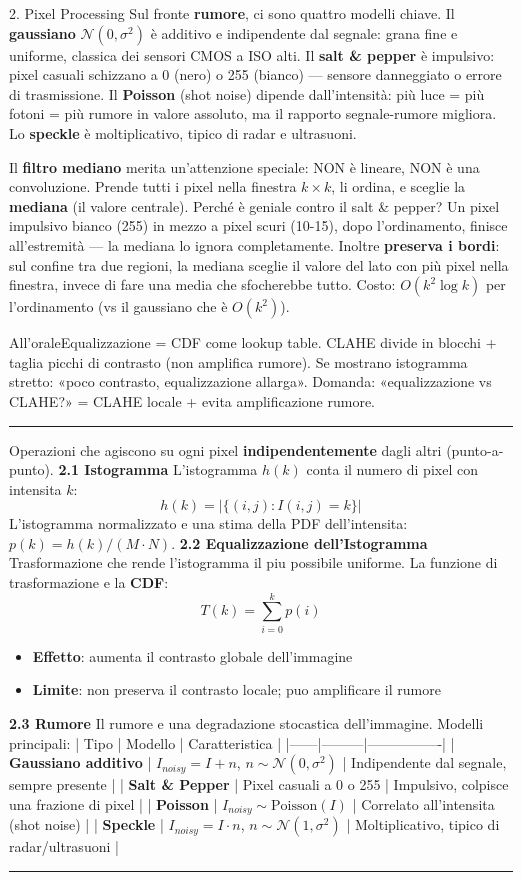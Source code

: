 \documentclass[italian,10pt]{beamer}
\newenvironment{orale}{%
  \setbeamercolor{block title}{fg=white,bg=co}%
  \setbeamercolor{block body}{fg=black,bg=co!5!white}%
  \begin{block}{All'orale}}{\end{block}}
\begin{document}
\begin{frame}[allowframebreaks]{2. Pixel Processing}
Sul fronte \textbf{rumore}, ci sono quattro modelli chiave. Il \textbf{gaussiano} $\mathcal{N}(0,\sigma^2)$ è additivo e indipendente dal segnale: grana fine e uniforme, classica dei sensori CMOS a ISO alti. Il \textbf{salt \& pepper} è impulsivo: pixel casuali schizzano a 0 (nero) o 255 (bianco) — sensore danneggiato o errore di trasmissione. Il \textbf{Poisson} (shot noise) dipende dall'intensità: più luce = più fotoni = più rumore in valore assoluto, ma il rapporto segnale-rumore migliora. Lo \textbf{speckle} è moltiplicativo, tipico di radar e ultrasuoni.

Il \textbf{filtro mediano} merita un'attenzione speciale: NON è lineare, NON è una convoluzione. Prende tutti i pixel nella finestra $k \times k$, li ordina, e sceglie la \textbf{mediana} (il valore centrale). Perché è geniale contro il salt \& pepper? Un pixel impulsivo bianco (255) in mezzo a pixel scuri (10-15), dopo l'ordinamento, finisce all'estremità — la mediana lo ignora completamente. Inoltre \textbf{preserva i bordi}: sul confine tra due regioni, la mediana sceglie il valore del lato con più pixel nella finestra, invece di fare una media che sfocherebbe tutto. Costo: $O(k^2 \log k)$ per l'ordinamento (vs il gaussiano che è $O(k^2)$).
\begin{orale}Equalizzazione = CDF come lookup table. CLAHE divide in blocchi + taglia picchi di contrasto (non amplifica rumore). Se mostrano istogramma stretto: «poco contrasto, equalizzazione allarga». Domanda: «equalizzazione vs CLAHE?» = CLAHE locale + evita amplificazione rumore.\end{orale}
\medskip\noindent\rule{\textwidth}{0.4pt}\medskip
Operazioni che agiscono su ogni pixel \textbf{indipendentemente} dagli altri (punto-a-punto).
\textbf{2.1 Istogramma}
L'istogramma $h(k)$ conta il numero di pixel con intensita $k$:
\[ h(k) = |\{(i,j) : I(i,j) = k\}| \]
L'istogramma normalizzato e una stima della PDF dell'intensita: $p(k) = h(k) / (M \cdot N)$.
\textbf{2.2 Equalizzazione dell'Istogramma}
Trasformazione che rende l'istogramma il piu possibile uniforme. La funzione di trasformazione e la \textbf{CDF}:
\[ T(k) = \sum_{i=0}^{k} p(i) \]
\begin{itemize}
\item \textbf{Effetto}: aumenta il contrasto globale dell'immagine
\item \textbf{Limite}: non preserva il contrasto locale; puo amplificare il rumore
\end{itemize}
\textbf{2.3 Rumore}
Il rumore e una degradazione stocastica dell'immagine.
Modelli principali:
| Tipo | Modello | Caratteristica |
|------|---------|----------------|
| \textbf{Gaussiano additivo} | $I_{noisy} = I + n$, $n \sim \mathcal{N}(0, \sigma^2)$ | Indipendente dal segnale, sempre presente |
| \textbf{Salt \& Pepper} | Pixel casuali a 0 o 255 | Impulsivo, colpisce una frazione di pixel |
| \textbf{Poisson} | $I_{noisy} \sim \text{Poisson}(I)$ | Correlato all'intensita (shot noise) |
| \textbf{Speckle} | $I_{noisy} = I \cdot n$, $n \sim \mathcal{N}(1, \sigma^2)$ | Moltiplicativo, tipico di radar/ultrasuoni |
\medskip\noindent\rule{\textwidth}{0.4pt}\medskip
\end{frame}
\end{document}

